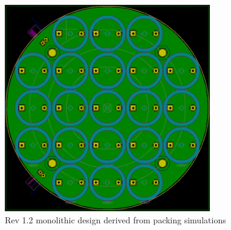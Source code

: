 \begin{figure}[ht!]
    \centering
    \includegraphics[width=0.8\textwidth]{Figures/Design/PCB/closeups/circCloserev1.2.png}
    \caption{Rev 1.2 monolithic design derived from packing simulations}
    \label{fig:CircMonoPCB}
\end{figure}

